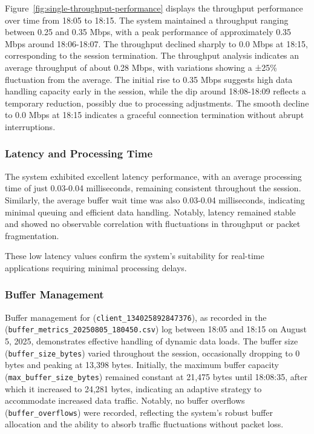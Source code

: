 Figure~\ref{fig:single-throughput-performance} displays the throughput performance over time from 18:05 to 18:15. The system maintained a throughput ranging between 0.25 and 0.35 Mbps, with a peak performance of approximately 0.35 Mbps around 18:06-18:07. The throughput declined sharply to 0.0 Mbps at 18:15, corresponding to the session termination.
The throughput analysis indicates an average throughput of about 0.28 Mbps, with variations showing a ±25\% fluctuation from the average. The initial rise to 0.35 Mbps suggests high data handling capacity early in the session, while the dip around 18:08-18:09 reflects a temporary reduction, possibly due to processing adjustments. The smooth decline to 0.0 Mbps at 18:15 indicates a graceful connection termination without abrupt interruptions.


\subsubsection{Latency and Processing Time}
The system exhibited excellent latency performance, with an average processing time of just 0.03-0.04 milliseconds, remaining consistent throughout the session. Similarly, the average buffer wait time was also 0.03-0.04 milliseconds, indicating minimal queuing and efficient data handling. Notably, latency remained stable and showed no observable correlation with fluctuations in throughput or packet fragmentation.

These low latency values confirm the system's suitability for real-time applications requiring minimal processing delays.

\subsubsection{Buffer Management}
Buffer management for (\texttt{client\_134025892847376}), as recorded in the (\texttt{buffer\_metrics\_20250805\_180450.csv}) log between 18:05 and 18:15 on August 5, 2025, demonstrates effective handling of dynamic data loads. The buffer size (\texttt{buffer\_size\_bytes}) varied throughout the session, occasionally dropping to 0 bytes and peaking at 13{,}398 bytes. Initially, the maximum buffer capacity (\texttt{max\_buffer\_size\_bytes}) remained constant at 21{,}475 bytes until 18:08:35, after which it increased to 24{,}281 bytes, indicating an adaptive strategy to accommodate increased data traffic. Notably, no buffer overflows (\texttt{buffer\_overflows}) were recorded, reflecting the system’s robust buffer allocation and the ability to absorb traffic fluctuations without packet loss.

